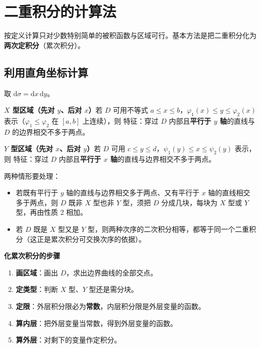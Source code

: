 
\section{二重积分的计算法}

按定义计算只对少数特别简单的被积函数与区域可行。基本方法是把二重积分化为\textbf{两次定积分}（累次积分）。

\subsection{利用直角坐标计算}

取 $\mathrm{d}\sigma=\mathrm{d}x\,\mathrm{d}y$。

\textbf{$X$ 型区域（先对 $y$、后对 $x$）}\quad 若 $D$ 可用不等式 $a\le x\le b$，$\varphi_1(x)\le y\le\varphi_2(x)$ 表示（$\varphi_1\le\varphi_2$ 在 $[a,b]$ 上连续），则
特征：穿过 $D$ 内部且\textbf{平行于 $y$ 轴}的直线与 $D$ 的边界相交不多于两点。

\textbf{$Y$ 型区域（先对 $x$、后对 $y$）}\quad 若 $D$ 可用 $c\le y\le d$，$\psi_1(y)\le x\le\psi_2(y)$ 表示，则
特征：穿过 $D$ 内部且\textbf{平行于 $x$ 轴}的直线与边界相交不多于两点。

两种情形要处理：

\begin{itemize}
  \item 若既有平行于 $y$ 轴的直线与边界相交多于两点、又有平行于 $x$ 轴的直线相交多于两点，则 $D$ 既非 $X$ 型也非 $Y$ 型，须把 $D$ 分成几块，每块为 $X$ 型或 $Y$ 型，再由性质 2 相加。
  \item 若 $D$ 既是 $X$ 型又是 $Y$ 型，则两种次序的二次积分相等，都等于同一个二重积分（这正是累次积分可交换次序的依据）。
\end{itemize}

\textbf{化累次积分的步骤}

\begin{enumerate}
  \item \textbf{画区域}：画出 $D$，求出边界曲线的全部交点。
  \item \textbf{定类型}：判断 $X$ 型、$Y$ 型还是需分块。
  \item \textbf{定限}：外层积分限必为\textbf{常数}，内层积分限是外层变量的函数。
  \item \textbf{算内层}：把外层变量当常数，得到外层变量的函数。
  \item \textbf{算外层}：对剩下的变量作定积分。
\end{enumerate}

